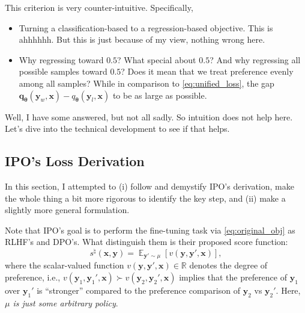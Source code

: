\documentclass[11pt,a4paper]{article}
\begin{document}
This criterion is very counter-intuitive. Specifically,
\begin{itemize}
    \item Turning a classification-based to a regression-based objective. This is ahhhhhh. But this is just because of my view, nothing wrong here.
    \item Why regressing toward $0.5$? What special about $0.5$? And why regressing all possible samples toward $0.5$? Does it mean that we treat preference evenly among all samples? While in comparison to \eqref{eq:unified_loss}, the gap $\bm{q}_{\boldsymbol \theta}(\bm{y}_{w}, \bm{x}) - q_{\boldsymbol \theta}(\bm{y}_l, \bm{x})$ to be as large as possible.
\end{itemize}
Well, I have some answered, but not all sadly.
So intuition does not help here. Let's dive into the technical development to see if that helps.


\subsection{IPO's Loss Derivation}%
\label{sub:ipo_s_loss_derivation}

In this section, I attempted to (i) follow and demystify IPO's derivation, make the whole thing a bit more rigorous to identify the key step, and (ii) make a slightly more general formulation.

Note that IPO's goal is to perform the fine-tuning task via \eqref{eq:original_obj} as RLHF's and DPO's. What distinguish them is their proposed score function:
\begin{equation}
\label{eq:s_v}
s^{\natural}(\bm{x}, \bm{y}) =  \mathop{\mathbb{E}}_{\bm{y}' \sim \mu} \left[ v(\bm{y}, \bm{y}', \bm{x}) \right],
\end{equation} 
where the scalar-valued function $v(\bm{y}, \bm{y}', \bm{x})\in \mathbb{R}$ denotes the degree of preference, i.e., $v(\bm{y}_1, \bm{y}_1', \bm{x}) \succ v(\bm{y}_2, \bm{y}_2', \bm{x})$ implies that the preference of $\bm{y}_1$ over $\bm{y}_1'$ is ``stronger'' compared to the preference comparison of $\bm{y}_2$ vs $\bm{y}_2'$. Here, \textit{$\mu$ is just some arbitrary policy}.
\end{document}
